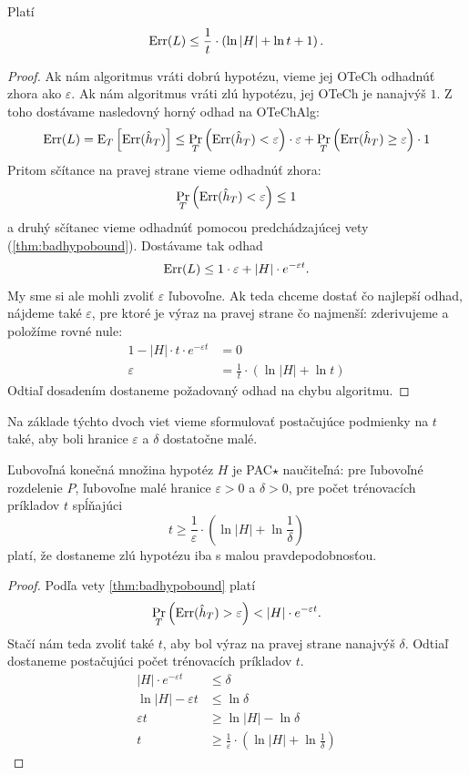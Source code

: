 \begin{theorem}
  Platí
  $$ \mathrm{Err}(L) \leq \frac{1}{t} \cdot \left( \ln{|H|} + \ln{t} + 1 \right). $$
\end{theorem}
\begin{proof}
  Ak nám algoritmus vráti dobrú hypotézu, vieme jej OTeCh odhadnúť zhora
  ako $\varepsilon$. Ak nám algoritmus vráti zlú hypotézu, jej OTeCh je
  nanajvýš $1$. Z toho dostávame nasledovný horný odhad na OTeChAlg:
  $$ \mathrm{Err}(L) = \mathrm{E}_T \left[ \mathrm{Err}(\hat{h}_T) \right] \leq \operatorname*{\textstyle\mathrm{Pr}}_T \left( \mathrm{Err}(\hat{h}_T) < \varepsilon \right) \cdot \varepsilon + \operatorname*{\textstyle\mathrm{Pr}}_T \left( \mathrm{Err}(\hat{h}_T) \geq \varepsilon \right) \cdot 1 $$
  Pritom sčítance na pravej strane vieme odhadnúť zhora:
  $$ \operatorname*{\textstyle\mathrm{Pr}}_T \left( \mathrm{Err}(\hat{h}_T) < \varepsilon \right) \leq 1 $$
  a druhý sčítanec vieme odhadnúť pomocou predchádzajúcej vety (\ref{thm:badhypobound}).
  Dostávame tak odhad
  $$ \mathrm{Err}(L) \leq 1 \cdot \varepsilon + |H| \cdot e^{-\varepsilon t}. $$
  My sme si ale mohli zvoliť $\varepsilon$ ľubovoľne. Ak teda chceme
  dostať čo najlepší odhad, nájdeme také $\varepsilon$, pre ktoré je výraz
  na pravej strane čo najmenší: zderivujeme a položíme rovné nule:
  \begin{align}
    1 - |H| \cdot t \cdot e^{-\varepsilon t} &= 0 \\
    \varepsilon &= \frac{1}{t} \cdot \left( \ln{|H|} + \ln{t} \right)
  \end{align}
  Odtiaľ dosadením dostaneme požadovaný odhad na chybu algoritmu.
\end{proof}

Na základe týchto dvoch viet vieme sformulovať postačujúce podmienky
na $t$ také, aby boli hranice $\varepsilon$ a $\delta$ dostatočne malé.

\begin{corollary}
  Ľubovoľná konečná množina hypotéz $H$ je PAC$\star$ naučiteľná: pre
  ľubovoľné rozdelenie $P$, ľubovoľne malé hranice $\varepsilon > 0$
  a $\delta > 0$, pre počet trénovacích príkladov $t$ spĺňajúci
  $$ t \geq \frac{1}{\varepsilon} \cdot \left( \ln{|H|} + \ln{\frac{1}{\delta}} \right) $$
  platí, že dostaneme zlú hypotézu iba s malou pravdepodobnosťou.
\end{corollary}
\begin{proof}
  Podľa vety \ref{thm:badhypobound} platí
  $$ \operatorname*{\textstyle\mathrm{Pr}}_T \left( \mathrm{Err}(\hat{h}_T) > \varepsilon \right) < |H| \cdot e^{-\varepsilon t}.$$
  Stačí nám teda zvoliť také $t$, aby bol výraz na pravej strane nanajvýš
  $\delta$. Odtiaľ dostaneme postačujúci počet trénovacích
  príkladov $t$.
  \begin{align}
    |H| \cdot e^{-\varepsilon t} &\leq \delta \\
    \ln{|H|} - \varepsilon t &\leq \ln{\delta} \\
    \varepsilon t &\geq \ln{|H|} - \ln{\delta} \\
    t &\geq \frac{1}{\varepsilon} \cdot \left( \ln{|H|} + \ln{\frac{1}{\delta}} \right)
  \end{align}
\end{proof}



